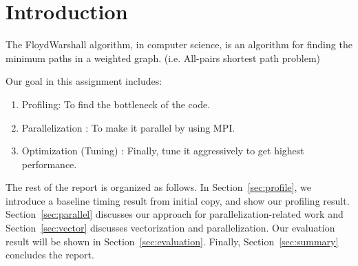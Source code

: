 \section{Introduction}\label{sec:intro}
The Floyd\textendash Warshall algorithm, in computer science, is an algorithm
for finding the minimum paths in a weighted graph. (i.e. All-pairs shortest
    path problem)

Our goal in this assignment includes:

\begin{enumerate}
  \item Profiling: To find the bottleneck of the code.
  \item Parallelization : To make it parallel by using MPI.
  \item Optimization (Tuning) : Finally, tune it aggressively to get highest
                                performance.
\end{enumerate}


The rest of the report is organized as follows. In
Section~\ref{sec:profile},
we introduce a baseline timing result from initial copy, and show our
profiling result. 
Section~\ref{sec:parallel} discusses our approach for
parallelization-related work and Section~\ref{sec:vector} discusses
vectorization and parallelization. Our evaluation result will be shown in
Section~\ref{sec:evaluation}. Finally, Section~\ref{sec:summary} concludes the
report.
